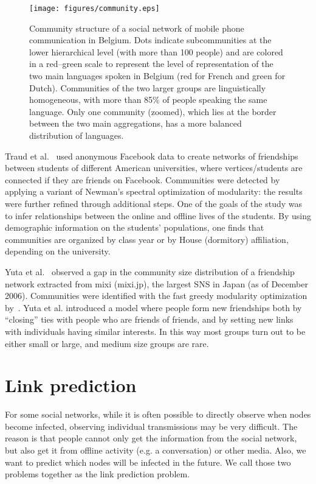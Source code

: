 \begin{figure}[!htb]
  \centering
  \texttt{[image: figures/community.eps]}
  \caption{Community structure of a social network of mobile phone
    communication in Belgium. Dots indicate subcommunities at the
    lower hierarchical level (with more than 100 people) and are
    colored in a red–green scale to represent the level of
    representation of the two main languages spoken in Belgium (red
    for French and green for Dutch). Communities of the two larger
    groups are linguistically homogeneous, with more than 85\% of
    people speaking the same language. Only one community (zoomed),
    which lies at the border between the two main aggregations, has a
    more balanced distribution of languages.~\cite{blondel2008fast}}
  \label{fig:community}
\end{figure}


Traud et al.~\cite{traud2008community} used
anonymous Facebook data to create networks of friendships between students of different American universities, where
vertices/students are connected if they are friends on Facebook. Communities were detected by applying a variant of
Newman's spectral optimization of modularity: the results were further
refined through additional steps. One of the goals of the study was to
infer relationships between the online and offline lives
of the students. By using demographic information on the students' populations, one finds that communities are organized
by class year or by House (dormitory) affiliation, depending on the university. 

Yuta et al.~\cite{yuta2007gap} observed a gap in the
community size distribution of a friendship network extracted from mixi (mixi.jp), the largest SNS in Japan (as of December 2006). Communities were identified with the fast greedy modularity optimization by~\cite{clauset2004finding}.
Yuta et al. introduced a model where people form new friendships both by ``closing'' ties with people who are friends of friends, and by setting new links with individuals having similar interests. In this way most groups turn out to be either small or large, and medium size groups are rare.

\section{Link prediction}

For some social networks, while it is often possible to directly
observe when nodes become infected, observing individual transmissions
may be very difficult. The reason is that people cannot only get the
information from the social network, but also get it from offline
activity (e.g. a conversation) or other media. Also, we want to predict
which nodes will be infected in the future. We call those two problems
together as the link prediction problem. 

